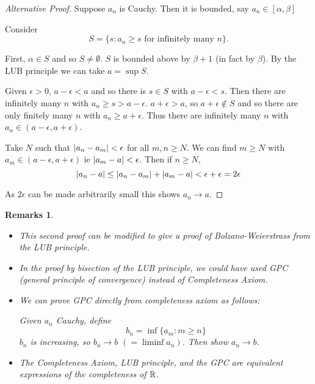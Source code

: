 \documentclass{notes}
\theoremstyle{plain}
\newtheorem*{remarks}{Remarks}
\begin{document}
\begin{proof}[Alternative Proof]
Suppose $ a_{n} $ is Cauchy. Then it is bounded, say
$a_{n} \in [\alpha, \beta]$

Consider
\[
S = \{ s: a_{n} \geq s \text{ for infinitely many $n$} \}. 
\]
 
 First, $ \alpha \in S $ and so $ S \neq \emptyset $.  $ S $ is 
 bounded above by $ \beta +1  $ (in fact by $ \beta $).
 By the LUB principle we can take $ a = \sup S $.
 
 Given $ \epsilon > 0 $, $ a - \epsilon < a $ and so 
 there is $ s \in S $ with $a - \epsilon < s$.
 Then there are infinitely many $ n $ with $a_{n}\geq s > 
 a-\epsilon$. 
 $ a+ \epsilon > a $, so $a+ \epsilon \notin S$ and so there 
 are only finitely many $ n $ with $a_{n} \geq a+ \epsilon$.
Thus there are infinitely many $ n $ with  $a_{n} \in (a - 
\epsilon, a+\epsilon)$.

Take $ N $ such that $\left|a_{n}-a_{m}\right| < \epsilon$ for all $ m,n 
\geq N $.
We can find $ m \geq N $ with $a_{m}\in (a-\epsilon, a + \epsilon)$ 
ie $\left|a_{m}-a\right|<\epsilon$.
Then if $ n \geq N $,
\[
\left|a_{n}-a\right| \leq \left|a_{n}-a_{m}\right| + \left|a_{m}-a\right| < 
\epsilon + \epsilon = 2 \epsilon
\]

As $ 2 \epsilon $ can be made arbitrarily small this shows $ a_{n} 
\to a $.
\end{proof}

\begin{remarks}
\

\begin{itemize}
\item This second proof can be modified to give a proof of 
Bolzano-Weierstrass from the LUB principle.
 
\item In the proof by bisection of the LUB principle, we could have used 
GPC (general principle of convergence) instead of Completeness Axiom.

\item We can prove GPC directly from completeness axiom as follows:

Given $ a_{n} $ Cauchy, define \[ b_{n} = \inf \{ a_{m}: m \geq n \} 
\] $ b_{n}  $ is increasing, so $ b_{n} \to b $ $ (= 
\liminf a_{n}) $. Then show $ a_{n} \to b $.

\item The Completeness Axiom, LUB principle, and the GPC are 
equivalent expressions of the completeness of $ \mathbb{R} $. 
\end{itemize}
\end{remarks}
\end{document}
